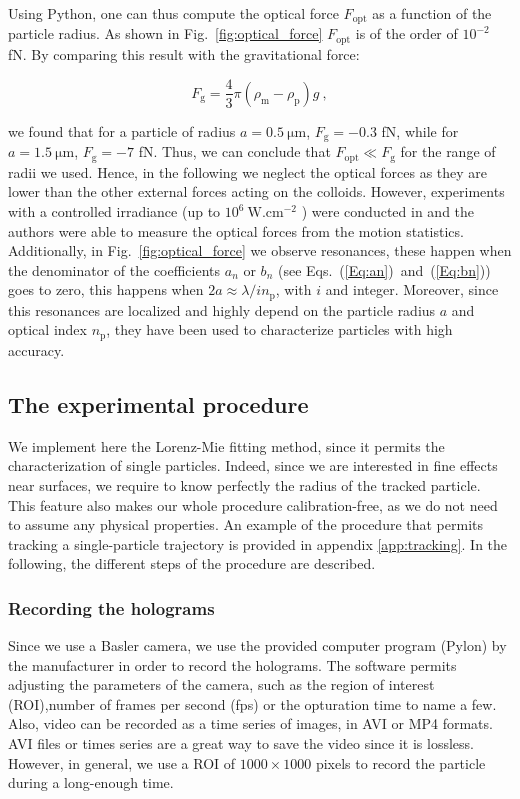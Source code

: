 Using Python, one can thus compute the optical force $F_\mathrm{opt}$ as a function of the particle radius. As shown in Fig.~\ref{fig:optical_force}  $F_\mathrm{opt}$ is of the order of $10^{-2}$ fN. By comparing this result with the gravitational force:

\begin{equation}
	F_\mathrm{g} =  \frac{4}{3} \pi (\rho_\mathrm{m} - \rho_\mathrm{p}) g ~,
\end{equation}

we found that for a particle of radius $a = 0.5 ~\mathrm{\mu m}$, $F_\mathrm{g} = -0.3 $ fN, while for $a = 1.5 ~\mathrm{\mu m}$, $F_\mathrm{g} = -7 $ fN. Thus, we can conclude that $F_\mathrm{opt} \ll F_\mathrm{g}$ for the range of radii we used. Hence, in the following we neglect the optical forces as they are lower than the other external forces acting on the colloids. However,  experiments with a controlled irradiance (up to $10^6 ~\mathrm{W.cm^{-2}}$ ) were conducted in \cite{prieve_measurement_1999} and the authors were able to measure the optical forces from the motion statistics. Additionally, in Fig.~\ref{fig:optical_force} we observe resonances, these happen when the denominator of the coefficients $a_n$ or $b_n$ (see Eqs.~(\ref{Eq:an})~and~(\ref{Eq:bn})) goes to zero, this happens when $2a \approx \lambda / in_\mathrm{p}$, with $i$ and integer. Moreover, since this resonances are localized and highly depend on the particle radius $a$ and optical index $n_\mathrm{p}$, they have been used to characterize particles with high accuracy. 






\subsection{The experimental procedure}
We implement here the Lorenz-Mie fitting method, since it permits the characterization of single particles. Indeed, since we are interested in fine effects near surfaces, we require to know perfectly the radius of the tracked particle. This feature also makes our whole procedure calibration-free, as we do not need to assume any physical properties. An example of the procedure that permits tracking a single-particle trajectory is provided in appendix \ref{app:tracking}. In the following, the different steps of the procedure are described.

\subsubsection{Recording the holograms}
Since we use a Basler camera, we use the provided computer program (Pylon) by the manufacturer in order to record the holograms. The software permits adjusting the parameters of the camera, such as the region of interest (\gls{ROI}),number of frames per second (\gls{fps}) or the opturation time to name a few. Also, video can be recorded as a time series of images, in AVI or MP4 formats. AVI files or times series are a great way to save the video since it is lossless. However, in general, we use a \gls{ROI} of $1000 \times 1000$ pixels to record the particle during a long-enough time. 


